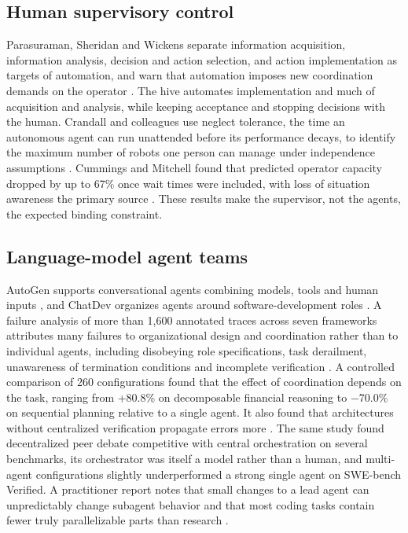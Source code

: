 \documentclass[11pt]{article}
\begin{document}
\subsection{Human supervisory control}

Parasuraman, Sheridan and Wickens separate information acquisition, information analysis, decision and action selection, and action implementation as targets of automation, and warn that automation imposes new coordination demands on the operator \cite{parasuraman2000}. The hive automates implementation and much of acquisition and analysis, while keeping acceptance and stopping decisions with the human. Crandall and colleagues use neglect tolerance, the time an autonomous agent can run unattended before its performance decays, to identify the maximum number of robots one person can manage under independence assumptions \cite{crandall2005}. Cummings and Mitchell found that predicted operator capacity dropped by up to 67\% once wait times were included, with loss of situation awareness the primary source \cite{cummings2008}. These results make the supervisor, not the agents, the expected binding constraint.

\subsection{Language-model agent teams}

AutoGen supports conversational agents combining models, tools and human inputs \cite{autogen}, and ChatDev organizes agents around software-development roles \cite{chatdev}. A failure analysis of more than 1,600 annotated traces across seven frameworks attributes many failures to organizational design and coordination rather than to individual agents, including disobeying role specifications, task derailment, unawareness of termination conditions and incomplete verification \cite{cemri}. A controlled comparison of 260 configurations found that the effect of coordination depends on the task, ranging from +80.8\% on decomposable financial reasoning to $-$70.0\% on sequential planning relative to a single agent. It also found that architectures without centralized verification propagate errors more \cite{kim}. The same study found decentralized peer debate competitive with central orchestration on several benchmarks, its orchestrator was itself a model rather than a human, and multi-agent configurations slightly underperformed a strong single agent on SWE-bench Verified. A practitioner report notes that small changes to a lead agent can unpredictably change subagent behavior and that most coding tasks contain fewer truly parallelizable parts than research \cite{anthropic2025}.
\end{document}
